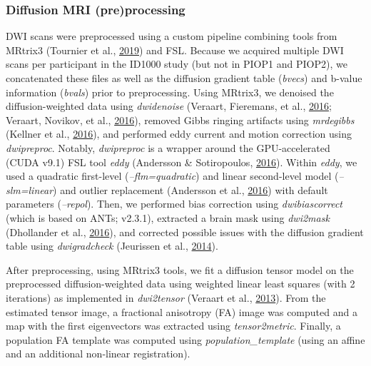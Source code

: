 \documentclass[12pt,american,a4paper,oneside,]{memoir} %
\begin{document}
\hypertarget{diffusion-mri-preprocessing}{%
\subsubsection{Diffusion MRI (pre)processing}\label{diffusion-mri-preprocessing}}

DWI scans were preprocessed using a custom pipeline combining tools from MRtrix3 (Tournier et al., \protect\hyperlink{ref-Tournier2019-hh}{2019}) and FSL. Because we acquired multiple DWI scans per participant in the ID1000 study (but not in PIOP1 and PIOP2), we concatenated these files as well as the diffusion gradient table (\emph{bvecs}) and b-value information (\emph{bvals}) prior to preprocessing. Using MRtrix3, we denoised the diffusion-weighted data using \emph{dwidenoise} (Veraart, Fieremans, et al., \protect\hyperlink{ref-Veraart2016-zi}{2016}; Veraart, Novikov, et al., \protect\hyperlink{ref-Veraart2016-rv}{2016}), removed Gibbs ringing artifacts using \emph{mrdegibbs} (Kellner et al., \protect\hyperlink{ref-Kellner2016-xb}{2016}), and performed eddy current and motion correction using \emph{dwipreproc}. Notably, \emph{dwipreproc} is a wrapper around the GPU-accelerated (CUDA v9.1) FSL tool \emph{eddy} (Andersson \& Sotiropoulos, \protect\hyperlink{ref-Andersson2016-pg}{2016}). Within \emph{eddy}, we used a quadratic first-level (\emph{--flm=quadratic}) and linear second-level model (\emph{--slm=linear}) and outlier replacement (Andersson et al., \protect\hyperlink{ref-Andersson2016-nm}{2016}) with default parameters (\emph{--repol}). Then, we performed bias correction using \emph{dwibiascorrect} (which is based on ANTs; v2.3.1), extracted a brain mask using \emph{dwi2mask} (Dhollander et al., \protect\hyperlink{ref-Dhollander2016-dx}{2016}), and corrected possible issues with the diffusion gradient table using \emph{dwigradcheck} (Jeurissen et al., \protect\hyperlink{ref-Jeurissen2014-cd}{2014}).

After preprocessing, using MRtrix3 tools, we fit a diffusion tensor model on the preprocessed diffusion-weighted data using weighted linear least squares (with 2 iterations) as implemented in \emph{dwi2tensor} (Veraart et al., \protect\hyperlink{ref-Veraart2013-ya}{2013}). From the estimated tensor image, a fractional anisotropy (FA) image was computed and a map with the first eigenvectors was extracted using \emph{tensor2metric}. Finally, a population FA template was computed using \emph{population\_template} (using an affine and an additional non-linear registration).
\end{document}
